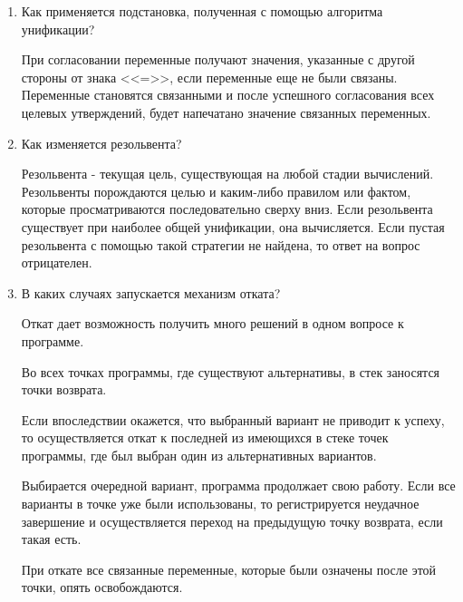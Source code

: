 \documentclass[a4paper,14pt]{extreport} %
\begin{document}
\begin{enumerate}
\item Как применяется подстановка, полученная с помощью алгоритма унификации?

При согласовании переменные получают значения, указанные с другой стороны от знака <<=>>, если переменные еще не были связаны. Переменные становятся связанными и после успешного согласования всех целевых утверждений, будет напечатано значение связанных переменных.

\item Как изменяется резольвента?

Резольвента - текущая цель, существующая на любой стадии вычислений. Резольвенты порождаются целью и каким-либо правилом или фактом, которые просматриваются последовательно сверху вниз. Если резольвента существует при наиболее общей унификации, она вычисляется. Если пустая резольвента с помощью такой стратегии не найдена, то ответ на вопрос отрицателен.

\item В каких случаях запускается механизм отката?

Откат дает возможность получить много решений в одном вопросе к программе. 

Во всех точках программы, где существуют альтернативы, в стек заносятся точки возврата. 

Если впоследствии окажется, что выбранный вариант не приводит к успеху, то осуществляется откат к последней из имеющихся в стеке точек программы, где был выбран один из альтернативных вариантов. 

Выбирается очередной вариант, программа продолжает свою работу. Если все варианты в точке уже были использованы, то регистрируется неудачное завершение и осуществляется переход на предыдущую точку возврата, если такая есть. 

При откате все связанные переменные, которые были означены после этой точки, опять освобождаются.

\end{enumerate}
 
\end{document}
